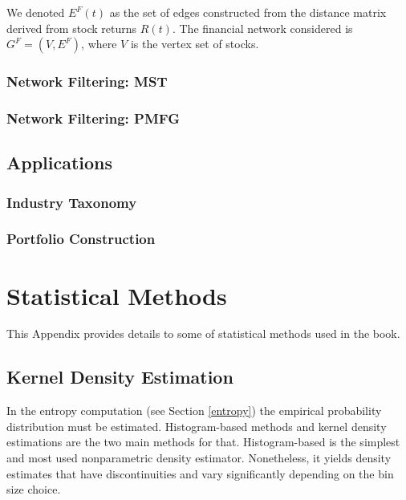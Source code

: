 \documentclass[]{book}
\theoremstyle{definition}
\theoremstyle{definition}
\theoremstyle{definition}
\theoremstyle{remark}
\begin{document}
We denoted \(E^{F}(t)\) as the set of edges constructed from the
distance matrix derived from stock returns \(R(t)\). The financial
network considered is \(G^{F} = ( V, E^{F} )\), where \(V\) is the
vertex set of stocks.

\subsection{Network Filtering: MST}\label{network-filtering-mst}

\subsection{Network Filtering: PMFG}\label{network-filtering-pmfg}

\section{Applications}\label{applications}

\subsection{Industry Taxonomy}\label{industry-taxonomy}

\subsection{Portfolio Construction}\label{portfolio-construction}

\appendix {}


\chapter{Statistical Methods}\label{statistical-methods}

This Appendix provides details to some of statistical methods used in
the book.

\section{Kernel Density Estimation}\label{kde}

In the entropy computation (see Section \ref{entropy}) the empirical
probability distribution must be estimated. Histogram-based methods and
kernel density estimations are the two main methods for that.
Histogram-based is the simplest and most used nonparametric density
estimator. Nonetheless, it yields density estimates that have
discontinuities and vary significantly depending on the bin size choice.
\end{document}
